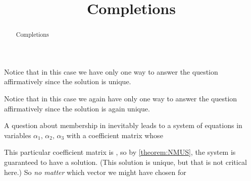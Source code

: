 \documentclass{ximera}
\title{Completions}
\begin{document}
\begin{abstract}
  Completions
\end{abstract}
\maketitle

\begin{example}
  \begin{question}
    \begin{multipleChoice}
    \end{multipleChoice}
    
    \begin{feedback}[correct]
      \begin{question}
        \begin{multipleChoice}
        \end{multipleChoice}

        \begin{feedback}[correct]
          Notice that in this case we have only one way to answer the
          question affirmatively since the solution is unique.
        \end{feedback}
      \end{question}
    \end{feedback}
  \end{question}

  \begin{question}
    \begin{multipleChoice}
    \end{multipleChoice}

    \begin{feedback}[correct]
      Notice that in this case we again have only one way to answer the
      question affirmatively since the solution is again unique.
    \end{feedback}
  \end{question}

  \begin{question}
    A question about membership in inevitably leads to a
    system of  equations in  variables
    $\alpha_1,\,\alpha_2,\,\alpha_3$ with a coefficient matrix whose

    This particular coefficient matrix is
    , so by
    \ref{theorem:NMUS}, the system is guaranteed to have a solution.
    (This solution is unique, but that is not critical here.)  So
    \textit{no matter} which vector we might have chosen for
  \end{question}
\end{example}
\end{document}
